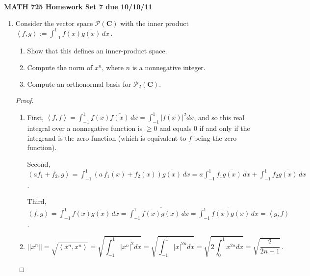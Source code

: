 \documentclass[11pt]{amsart}
\begin{document}
\setlength{\parindent}{0pt}
\setlength{\parskip}{0.4cm}
\thispagestyle{empty} 
\def\Id{\mathrm I}
\def\0{\mathbf 0}
\def\e{\mathbf e}
\def\r{\mathbf r}
\def\u{\mathbf u}
\def\v{\mathbf v}
\def\w{\mathbf w}
\def\C{\mathbf{C}}
\def\F{\mathbf{F}}
\def\R{\mathbf{R}}
\def\Z{\mathbf{Z}}
\def\P{\mathcal{P}}
\renewcommand\Re{\operatorname{Re}}
\newcommand\spn{\operatorname{span}}
\renewcommand\null{\operatorname{null}}
\newcommand\range{\operatorname{range}}
\newcommand\rank{\operatorname{rank}}
\newcommand\norm[1]{\left|\left| #1 \right|\right|}
\newcommand\inner[2]{\left< #1, #2 \right>}

\begin{center} {\bf MATH 725 \qquad \qquad Homework Set 7 \qquad \qquad due 10/10/11} \end{center} 

\begin{enumerate}[(1)]

\item Consider the vector space $\P(\C)$ with the inner product $\inner f g := \int_{ -1 }^1 f(x) \overline{g(x)} \, dx \, .$
  \begin{enumerate}
  \item Show that this defines an inner-product space.
  \item Compute the norm of $x^n$, where $n$ is a nonnegative integer.
  \item Compute an orthonormal basis for $\P_2(\C)$.
  \end{enumerate}

\begin{proof}
\begin{enumerate}

\item First, $\inner f f = \int_{ -1 }^1 f(x) \overline{f(x)} \, dx = \int_{ -1 }^1 \left| f(x) \right|^2 dx$, and so this real integral over a nonnegative function is $\ge 0$ and equals 0 if and only if the integrand is the zero function (which is equivalent to $f$ being the zero function).

Second, $\inner{ a f_1 + f_2 } g = \int_{ -1 }^1 \left( a \, f_1(x) + f_2(x) \right) \overline{ g(x) } \, dx = a \int_{ -1 }^1 f_1 \overline{ g(x) } \, dx + \int_{ -1 }^1 f_2 \overline{ g(x) } \, dx$.

Third, $\inner f g = \int_{ -1 }^1 f(x) \overline{g(x)} \, dx = \int_{ -1 }^1 \overline{ \overline{f(x)} g(x) } \, dx = \overline{ \int_{ -1 }^1 \overline{f(x)} g(x) \, dx } = \overline{ \inner g f }$.

\item
\[
  \norm{ x^n }
  = \sqrt{ \inner{ x^n }{ x^n } }
  = \sqrt{ \int_{ -1 }^1 \left| x^n \right|^2 dx }
  = \sqrt{ \int_{ -1 }^1 |x|^{ 2n } dx }
  = \sqrt{ 2 \int_{ 0 }^1 x^{ 2n } dx }
  = \sqrt{ \frac{ 2 }{ 2n+1 } } \, .
\]


\end{enumerate}
\end{proof}
\end{enumerate}
\end{document}
